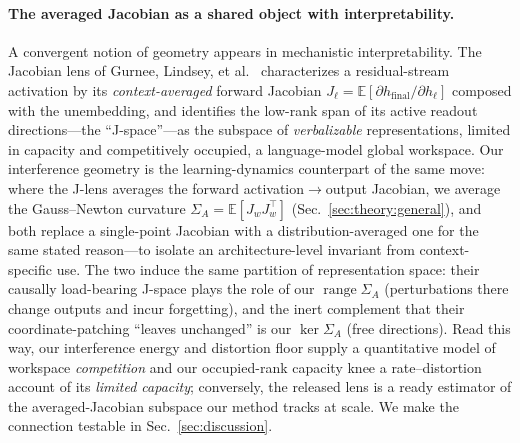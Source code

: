 \documentclass[10pt,a4paper]{article}
\theoremstyle{plain}
\theoremstyle{definition}
\newcommand{\Sig}{\Sigma}
\DeclareMathOperator{\range}{range}
\begin{document}
\paragraph{The averaged Jacobian as a shared object with interpretability.} A
convergent notion of geometry appears in mechanistic interpretability. The Jacobian
lens of Gurnee, Lindsey, et al.~\cite{gurnee2026gws} characterizes a residual-stream activation by its
\emph{context-averaged} forward Jacobian $J_\ell=\mathbb{E}[\partial h_{\mathrm{final}}/
\partial h_\ell]$ composed with the unembedding, and identifies the low-rank span of its
active readout directions---the ``J-space''---as the subspace of \emph{verbalizable}
representations, limited in capacity and competitively occupied, a language-model global
workspace. Our interference geometry is the learning-dynamics counterpart of the same
move: where the J-lens averages the forward activation$\to$output Jacobian, we average
the Gauss--Newton curvature $\Sig_A=\mathbb{E}[J_wJ_w^\top]$ (Sec.~\ref{sec:theory:general}),
and both replace a single-point Jacobian with a distribution-averaged one for the same
stated reason---to isolate an architecture-level invariant from context-specific use.
The two induce the same partition of representation space: their causally load-bearing
J-space plays the role of our $\range\Sig_A$ (perturbations there change outputs and
incur forgetting), and the inert complement that their coordinate-patching ``leaves
unchanged'' is our $\ker\Sig_A$ (free directions). Read this way, our interference
energy and distortion floor supply a quantitative model of workspace \emph{competition}
and our occupied-rank capacity knee a rate--distortion account of its \emph{limited
capacity}; conversely, the released lens is a ready estimator of the averaged-Jacobian
subspace our method tracks at scale. We make the connection testable in
Sec.~\ref{sec:discussion}.
\end{document}
